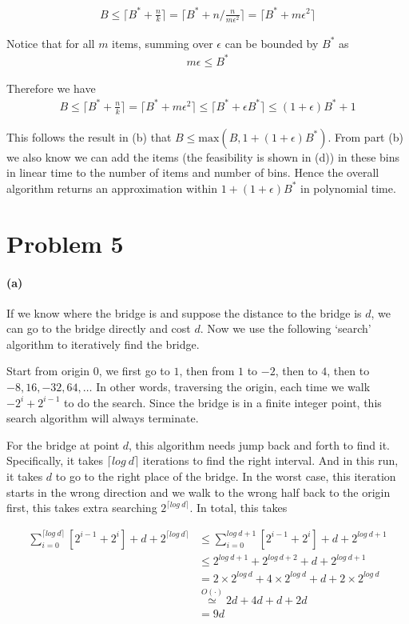 \documentclass[12pt]{article}
\begin{document}
\begin{align*}
B \leq \lceil B^* + \frac{n}{k} \rceil = \lceil B^* + n/\frac{n}{m\epsilon^2} \rceil= \lceil B^* + m\epsilon^2 \rceil
\end{align*}

Notice that for all $m$ items, summing over $\epsilon$ can be bounded by $B^*$ as 
\begin{align*}
m\epsilon \leq B^*
\end{align*}

Therefore we have 
\begin{align*}
B \leq \lceil B^* + \frac{n}{k} \rceil = \lceil B^* +  m\epsilon^2\rceil \leq \lceil B^* + \epsilon B^*\rceil \leq (1+\epsilon)B^* + 1
\end{align*}

This follows the result in (b) that $B \leq \text{max}(B, 1 + (1+\epsilon)B^*)$. From part (b) we also know we can add the items (the feasibility is shown in (d)) in these bins in linear time to the number of items and number of bins. Hence the overall algorithm returns an approximation within $1 + (1+\epsilon)B^*$ in polynomial time.
\newpage
\section*{Problem 5}
\paragraph{(a)} If we know where the bridge is and suppose the distance to the bridge is $d$, we can go to the bridge directly and cost $d$. Now we use the following `search' algorithm to iteratively find the bridge. 

Start from origin $0$, we first go to $1$, then from $1$ to $-2$, then to $4$, then to $-8, 16, -32, 64, \dots$ In other words, traversing the origin, each time we walk $-2^{i} + 2^{i-1}$ to do the search. Since the bridge is in a finite integer point, this search algorithm will always terminate. 

For the bridge at point $d$, this algorithm needs jump back and forth to find it. Specifically, it takes ${\lceil log\:d\rceil}$ iterations to find the right interval. And in this run, it takes $d$ to go to the right place of the bridge. In the worst case, this iteration starts in the wrong direction and we walk to the wrong half back to the origin first, this takes extra searching $2^{\lceil log\:d\rceil}$. In total, this takes 

\begin{align*}
\sum_{i=0}^{\lceil log\:d\rceil} \left[2^{i-1} + 2^{i}\right] + d + 2^{\lceil log\:d\rceil} &\leq \sum_{i=0}^{log\:d + 1} \left[2^{i-1} + 2^{i}\right] + d + 2^{log\:d + 1}\\
&\leq 2^{log\:d + 1} + 2^{log\:d + 2} + d + 2^{log\:d + 1}\\
&= 2\times 2^{log\:d} + 4\times 2^{log\:d} + d + 2 \times 2^{log\:d }\\
&\stackrel{O(\cdot)}{\simeq} 2d + 4d + d + 2d\\
&= 9d
\end{align*}
\end{document}
